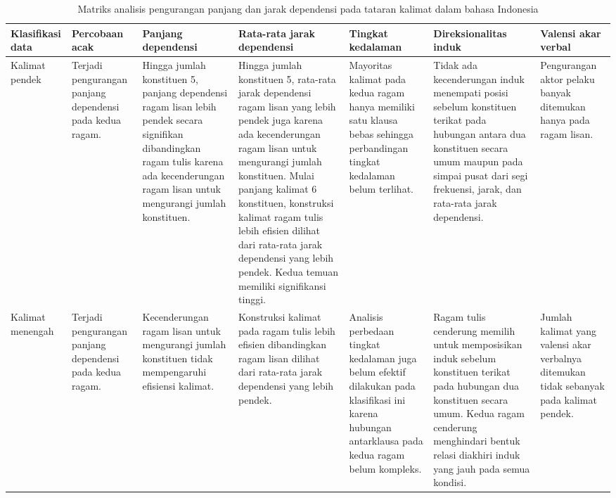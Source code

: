 \begin{landscape}
\begin{table}[htbp]
\caption{Matriks analisis pengurangan panjang dan jarak dependensi pada tataran kalimat dalam bahasa Indonesia}\label{tab:matriksanalisis}
\begin{scriptsize}
\begin{center}
\begin{tabular}{| p{1.3cm} | p{2.4cm} | p{2.5cm} | p{3.5cm} | p{3.5cm} | p{3cm} | p{3cm} | }
\hline
Klasifikasi data & Percobaan acak & Panjang dependensi & Rata-rata jarak dependensi & Tingkat kedalaman & Direksionalitas induk & Valensi akar verbal\\ \hline
Kalimat pendek & Terjadi pengurangan panjang dependensi pada kedua ragam. & Hingga jumlah konstituen 5, panjang dependensi ragam lisan lebih pendek secara signifikan dibandingkan ragam tulis karena ada kecenderungan ragam lisan untuk mengurangi jumlah konstituen. & Hingga jumlah konstituen 5, rata-rata jarak dependensi ragam lisan yang lebih pendek juga karena ada kecenderungan ragam lisan untuk mengurangi jumlah konstituen. Mulai panjang kalimat 6 konstituen, konstruksi kalimat ragam tulis lebih efisien dilihat dari rata-rata jarak dependensi yang lebih pendek. Kedua temuan memiliki signifikansi tinggi. & Mayoritas kalimat pada kedua ragam hanya memiliki satu klausa bebas sehingga perbandingan tingkat kedalaman belum terlihat. & Tidak ada kecenderungan induk menempati posisi sebelum konstituen terikat pada hubungan antara dua konstituen secara umum maupun pada simpai pusat dari segi frekuensi, jarak, dan rata-rata jarak dependensi. & Pengurangan aktor pelaku banyak ditemukan hanya pada ragam lisan. \\ \hline
Kalimat menengah & Terjadi pengurangan panjang dependensi pada kedua ragam. & Kecenderungan ragam lisan untuk mengurangi jumlah konstituen tidak mempengaruhi efisiensi kalimat. & Konstruksi kalimat pada ragam tulis lebih efisien dibandingkan ragam lisan dilihat dari rata-rata jarak dependensi yang lebih pendek. & Analisis perbedaan tingkat kedalaman juga belum efektif dilakukan pada klasifikasi ini karena hubungan antarklausa pada kedua ragam belum kompleks. & Ragam tulis cenderung memilih untuk memposisikan induk sebelum konstituen terikat pada hubungan dua konstituen secara umum. Kedua ragam cenderung menghindari bentuk relasi diakhiri induk yang jauh pada semua kondisi. & Jumlah kalimat yang valensi akar verbalnya ditemukan tidak sebanyak pada kalimat pendek. \\ \hline

\end{tabular}
\end{center}
\end{scriptsize}
\end{table}
\end{landscape}
